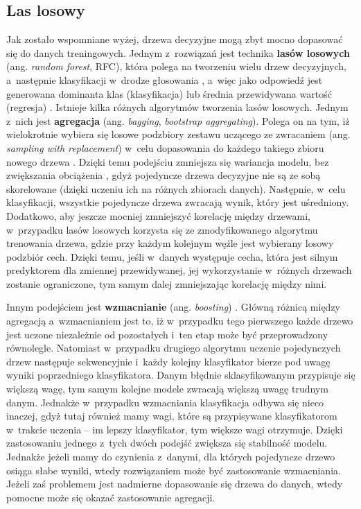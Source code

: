 \subsection{Las losowy}
\label{cha:Las losowy}

Jak zostało wspomniane wyżej, drzewa decyzyjne mogą zbyt mocno dopasować się do danych treningowych. Jednym z~rozwiązań jest technika \textbf{lasów losowych} (ang. \textit{random forest}, RFC), która polega na tworzeniu wielu drzew decyzyjnych, a~następnie klasyfikacji w~drodze głosowania \cite{Grus18}, a~więc jako odpowiedź jest generowana dominanta klas (klasyfikacja) lub średnia przewidywana wartość (regresja) \cite{Ho95}. Istnieje kilka różnych algorytmów tworzenia lasów losowych. Jednym z~nich jest \textbf{agregacja} (ang. \textit{bagging}, \textit{bootstrap aggregating}). Polega on na tym, iż wielokrotnie wybiera się losowe podzbiory zestawu uczącego ze zwracaniem (ang. \textit{sampling with replacement}) w~celu dopasowania do każdego takiego zbioru nowego drzewa \cite{Sawka18}. Dzięki temu podejściu zmniejsza się wariancja modelu, bez zwiększania obciążenia \cite{Ramchandani18}, gdyż pojedyncze drzewa decyzyjne nie są ze sobą skorelowane (dzięki uczeniu ich na różnych zbiorach danych). Następnie, w~celu klasyfikacji, wszystkie pojedyncze drzewa zwracają wynik, który jest uśredniony. Dodatkowo, aby jeszcze mocniej zmniejszyć korelację między drzewami, w~przypadku lasów losowych korzysta się ze zmodyfikowanego algorytmu trenowania drzewa, gdzie przy każdym kolejnym węźle jest wybierany losowy podzbiór cech. Dzięki temu, jeśli w~danych występuje cecha, która jest silnym predyktorem dla zmiennej przewidywanej, jej wykorzystanie w~różnych drzewach zostanie ograniczone, tym samym dalej zmniejszając korelację między nimi.

Innym podejściem jest \textbf{wzmacnianie} (ang. \textit{boosting}) \cite{aporras}. Główną różnicą między agregacją a~wzmacnianiem jest to, iż w~przypadku tego pierwszego każde drzewo jest uczone niezależnie od pozostałych i~ten etap może być przeprowadzony równolegle. Natomiast w~przypadku drugiego algorytmu uczenie pojedynczych drzew następuje sekwencyjnie i~każdy kolejny klasyfikator bierze pod uwagę wyniki poprzedniego klasyfikatora. Danym błędnie sklasyfikowanym przypisuje się większą wagę, tym samym kolejne modele zwracają większą uwagę trudnym danym. Jednakże w~przypadku wzmacniania klasyfikacja odbywa się nieco inaczej, gdyż tutaj również mamy wagi, które są przypisywane klasyfikatorom w~trakcie uczenia – im lepszy klasyfikator, tym większe wagi otrzymuje. Dzięki zastosowaniu jednego z~tych dwóch podejść zwiększa się stabilność modelu. Jednakże jeżeli mamy do czynienia z~danymi, dla których pojedyncze drzewo osiąga słabe wyniki, wtedy rozwiązaniem może być zastosowanie wzmacniania. Jeżeli zaś problemem jest nadmierne dopasowanie się drzewa do danych, wtedy pomocne może się okazać zastosowanie agregacji.

